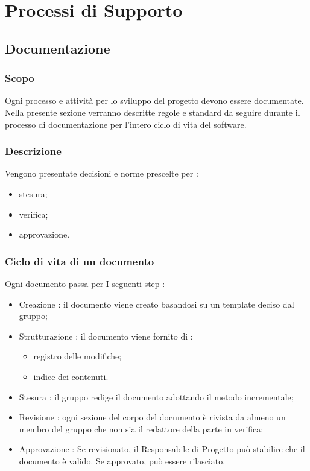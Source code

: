 \section{Processi di Supporto}
\subsection{Documentazione}
\subsubsection{Scopo}
Ogni processo e attività per lo sviluppo del progetto devono essere documentate. Nella presente sezione verranno descritte regole e standard da seguire durante il processo di documentazione per l’intero ciclo di vita del software.

\subsubsection{Descrizione}
Vengono presentate decisioni e norme prescelte per :
\begin{itemize}
  \item stesura;
  \item verifica;
  \item approvazione.
\end{itemize}

\subsubsection{Ciclo di vita di un documento}
Ogni documento passa per I seguenti step :
\begin{itemize}
  \item Creazione : il documento viene creato basandosi su un template deciso dal gruppo;
  \item Strutturazione  : il documento viene fornito di :
  \begin{itemize}
  		\item registro delle modifiche;
  		\item indice dei contenuti.
	\end{itemize}
  \item Stesura : il gruppo redige il documento adottando il metodo incrementale;
  \item Revisione : ogni sezione del corpo del documento è rivista da almeno un membro del gruppo che non sia il redattore della parte in verifica;
  \item Approvazione : Se revisionato, il Responsabile di Progetto può stabilire che il documento è valido. Se approvato, può essere rilasciato.

\end{itemize}

